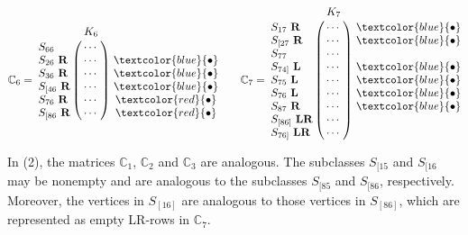 \documentclass[12pt]{book}
\theoremstyle{plain}
\theoremstyle{remark}
\begin{document}
\[   \mathbb C_6 = \bordermatrix{ & K_6\cr
                S_{66}\            & \cdots \cr
                S_{26}\ \textbf{R} & \cdots \cr
                S_{36}\ \textbf{R} & \cdots \cr
                S_{[46}\ \textbf{R} & \cdots \cr
                S_{76}\ \textbf{R} & \cdots \cr
                S_{[86}\ \textbf{R} & \cdots }\
                \begin{matrix}
                \\ \\  \textcolor{blue}{\bullet} \\  \textcolor{blue}{\bullet} \\ \textcolor{blue}{\bullet} \\ \textcolor{red}{\bullet} \\ \textcolor{red}{\bullet} \\ \\ 
                \end{matrix}  \qquad
    \mathbb C_7 = \bordermatrix{ & K_7\cr
				S_{17}\ \textbf{R} & \cdots \cr
				S_{[27}\ \textbf{R} & \cdots \cr
                S_{77}\            & \cdots \cr
                S_{74]}\ \textbf{L} & \cdots \cr
                S_{75}\ \textbf{L} & \cdots \cr
                S_{76}\ \textbf{L} & \cdots \cr
                S_{87}\ \textbf{R} & \cdots \cr
                S_{[86]}\ \textbf{LR} & \cdots \cr
                S_{76]}\ \textbf{LR} & \cdots }\
                \begin{matrix}
                \textcolor{blue}{\bullet} \\  \textcolor{blue}{\bullet} \\ \\ \textcolor{blue}{\bullet} \\ \textcolor{blue}{\bullet} \\ \textcolor{blue}{\bullet}  \\ \textcolor{blue}{\bullet} \\ \\ \\
                \end{matrix}  \]

In (2), the matrices $\mathbb C_1$, $\mathbb C_2$ and $\mathbb C_3$ are analogous. The subclasses $S_{[15}$ and $S_{[16}$ may be nonempty and are analogous to the subclasses $S_{[85}$ and $S_{[86}$, respectively. Moreover, the vertices in $S_{[16]}$ are analogous to those vertices in $S_{[86]}$, which are represented as empty LR-rows in $\mathbb C_7$. 
\end{document}
